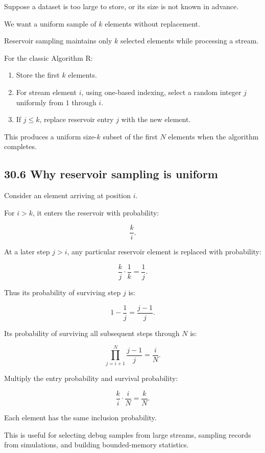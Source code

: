 Suppose a dataset is too large to store, or its size is not known in advance.

We want a uniform sample of \(k\) elements without replacement.

Reservoir sampling maintains only \(k\) selected elements while processing a stream.

For the classic Algorithm R:

\begin{enumerate}
\def\labelenumi{\arabic{enumi}.}
\tightlist
\item
  Store the first \(k\) elements.
\item
  For stream element \(i\), using one-based indexing, select a random integer \(j\) uniformly from \(1\) through \(i\).
\item
  If \(j\le k\), replace reservoir entry \(j\) with the new element.
\end{enumerate}

This produces a uniform size-\(k\) subset of the first \(N\) elements when the algorithm completes.

\subsection{30.6 Why reservoir sampling is uniform}\label{02-foundations-ii-ch031-why-reservoir-sampling-is-uniform}

Consider an element arriving at position \(i\).

For \(i>k\), it enters the reservoir with probability:

\[ \frac{k}{i}. \]

At a later step \(j>i\), any particular reservoir element is replaced with probability:

\[ \frac{k}{j}\cdot\frac1k=\frac1j. \]

Thus its probability of surviving step \(j\) is:

\[ 1-\frac1j=\frac{j-1}{j}. \]

Its probability of surviving all subsequent steps through \(N\) is:

\[ \prod_{j=i+1}^{N}\frac{j-1}{j} = \frac iN. \]

Multiply the entry probability and survival probability:

\[ \frac ki\cdot\frac iN = \boxed{\frac kN}. \]

Each element has the same inclusion probability.

This is useful for selecting debug samples from large streams, sampling records from simulations, and building bounded-memory statistics.

